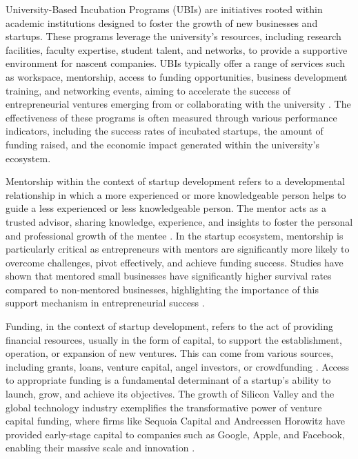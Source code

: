 \documentclass[../Main.tex]{subfiles}
\begin{document}
University-Based Incubation Programs (UBIs) are initiatives rooted within academic institutions designed to foster the growth of new businesses and startups. These programs leverage the university's resources, including research facilities, faculty expertise, student talent, and networks, to provide a supportive environment for nascent companies. UBIs typically offer a range of services such as workspace, mentorship, access to funding opportunities, business development training, and networking events, aiming to accelerate the success of entrepreneurial ventures emerging from or collaborating with the university \autocite{grimaldi2005university, siegel2003assessing}. The effectiveness of these programs is often measured through various performance indicators, including the success rates of incubated startups, the amount of funding raised, and the economic impact generated within the university's ecosystem.

Mentorship within the context of startup development refers to a developmental relationship in which a more experienced or more knowledgeable person helps to guide a less experienced or less knowledgeable person. The mentor acts as a trusted advisor, sharing knowledge, experience, and insights to foster the personal and professional growth of the mentee \autocite{jacobi1991mentorship, nationalacademies2019mentoring}. In the startup ecosystem, mentorship is particularly critical as entrepreneurs with mentors are significantly more likely to overcome challenges, pivot effectively, and achieve funding success. Studies have shown that mentored small businesses have significantly higher survival rates compared to non-mentored businesses, highlighting the importance of this support mechanism in entrepreneurial success \autocite{kauffman2013mentoring}.

Funding, in the context of startup development, refers to the act of providing financial resources, usually in the form of capital, to support the establishment, operation, or expansion of new ventures. This can come from various sources, including grants, loans, venture capital, angel investors, or crowdfunding \autocite{bruneel2010funding, lerner2018venture}. Access to appropriate funding is a fundamental determinant of a startup's ability to launch, grow, and achieve its objectives. The growth of Silicon Valley and the global technology industry exemplifies the transformative power of venture capital funding, where firms like Sequoia Capital and Andreessen Horowitz have provided early-stage capital to companies such as Google, Apple, and Facebook, enabling their massive scale and innovation \autocite{lerner2012venture}.
\end{document}
